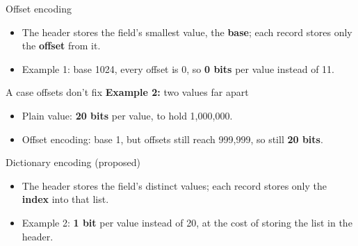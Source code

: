 \documentclass[aspectratio=169,11pt]{beamer}
\newcommand{\encodingfig}[1]{%
\begingroup
\def\encodingextra{#1}%
%
\endgroup}
\newcommand{\dictfig}{}
\newcommand{\vals}[1]{\foreach \v [count=\k] in {#1} \node[draw=black!65,fill=blue!8,minimum height=6mm,minimum width=14mm,font=\small,inner sep=2pt] at (\k*1.5,0) {\v};}
\begin{document}
\begin{frame}{Offset encoding}
\begin{itemize}
\item The header stores the field's smallest value, the \textbf{base}; each record stores only the \textbf{offset} from it.
\end{itemize}
\vspace{4mm}
\centering\encodingfig{}
\par\raggedright
\vspace{4mm}
\begin{itemize}
\item Example 1: base 1024, every offset is 0, so \textbf{0 bits} per value instead of 11.
\end{itemize}
\end{frame}

\begin{frame}{A case offsets don't fix}
\textbf{Example 2:} two values far apart
\vspace{2mm}

\vspace{3mm}

\begin{itemize}
\item Plain value: \textbf{20 bits} per value, to hold 1,000,000.
\item Offset encoding: base 1, but offsets still reach 999,999, so still \textbf{20 bits}.
\end{itemize}
\end{frame}

\begin{frame}{Dictionary encoding (proposed)}
\begin{itemize}
\item The header stores the field's distinct values; each record stores only the \textbf{index} into that list.
\end{itemize}
\vspace{4mm}
\centering\dictfig
\par\raggedright
\vspace{4mm}
\begin{itemize}
\item Example 2: \textbf{1 bit} per value instead of 20, at the cost of storing the list in the header.
\end{itemize}
\end{frame}
\end{document}
